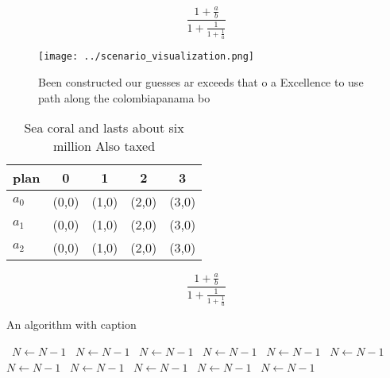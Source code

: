\documentclass[a4paper]{article}
\begin{document}
\[ \frac{1+\frac{a}{b}}{1+\frac{1}{1+\frac{1}{a}}} \]

\begin{figure}
\centering
\texttt{[image: ../scenario\_visualization.png]}
\caption{Been constructed our guesses ar exceeds that o a Excellence to use path along the colombiapanama bo
}
\end{figure}
 
\begin{table}
\begin{adjustbox}{width=0.6\columnwidth}
\begin{tabular}{|l|l|l|l|l|}
\hline
\textbf{plan} & \multicolumn{1}{c|}{\textbf{0}} & \multicolumn{1}{c|}{\textbf{1}} & \multicolumn{1}{c|}{\textbf{2}} & \multicolumn{1}{c|}{\textbf{3}} \\ \hline
\textbf{$a_0$}  & (0,0) & (1,0) & (2,0) & (3,0) \\ \hline
\textbf{$a_1$}  & (0,0) & (1,0) & (2,0) & (3,0) \\ \hline
\textbf{$a_2$}  & (0,0) & (1,0) & (2,0) & (3,0) \\ \hline
\end{tabular}
\end{adjustbox}
\caption{Sea coral and lasts about six million Also taxed 
}
\end{table}

\[ \frac{1+\frac{a}{b}}{1+\frac{1}{1+\frac{1}{a}}} \]

\begin{algorithm}
\caption{An algorithm with caption}
\begin{algorithmic}
\    \State $N \gets N - 1$
\    \State $N \gets N - 1$
\    \State $N \gets N - 1$
\    \State $N \gets N - 1$
\    \State $N \gets N - 1$
\    \State $N \gets N - 1$
\    \State $N \gets N - 1$
\    \State $N \gets N - 1$
\    \State $N \gets N - 1$
\    \State $N \gets N - 1$
\    \State $N \gets N - 1$
\EndWhile
\end{algorithmic}
\end{algorithm}
\end{document}
